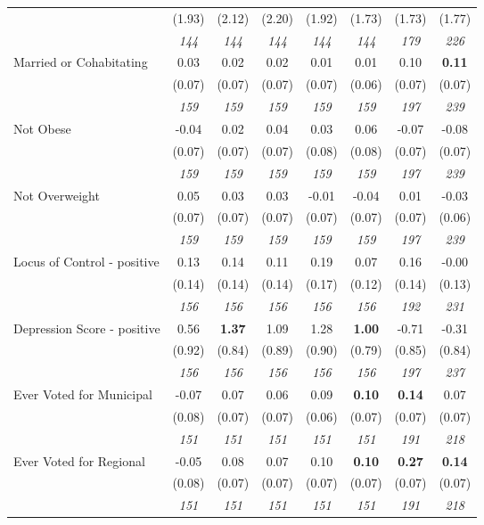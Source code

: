 \begin{tabular}{l c c c c c c c}
& (1.93) & (2.12) & (2.20) & (1.92) & (1.73) & (1.73) & (1.77) \\
& \textit{ 144 } & \textit{ 144 } & \textit{ 144 } & \textit{ 144 } & \textit{ 144 } & \textit{ 179 } & \textit{ 226 } \\
Married or Cohabitating & 0.03 & 0.02 & 0.02 & 0.01 & 0.01 & 0.10 & \textbf{0.11} \\
& (0.07) & (0.07) & (0.07) & (0.07) & (0.06) & (0.07) & (0.07) \\
& \textit{ 159 } & \textit{ 159 } & \textit{ 159 } & \textit{ 159 } & \textit{ 159 } & \textit{ 197 } & \textit{ 239 } \\
Not Obese & -0.04 & 0.02 & 0.04 & 0.03 & 0.06 & -0.07 & -0.08 \\
& (0.07) & (0.07) & (0.07) & (0.08) & (0.08) & (0.07) & (0.07) \\
& \textit{ 159 } & \textit{ 159 } & \textit{ 159 } & \textit{ 159 } & \textit{ 159 } & \textit{ 197 } & \textit{ 239 } \\
Not Overweight & 0.05 & 0.03 & 0.03 & -0.01 & -0.04 & 0.01 & -0.03 \\
& (0.07) & (0.07) & (0.07) & (0.07) & (0.07) & (0.07) & (0.06) \\
& \textit{ 159 } & \textit{ 159 } & \textit{ 159 } & \textit{ 159 } & \textit{ 159 } & \textit{ 197 } & \textit{ 239 } \\
Locus of Control - positive & 0.13 & 0.14 & 0.11 & 0.19 & 0.07 & 0.16 & -0.00 \\
& (0.14) & (0.14) & (0.14) & (0.17) & (0.12) & (0.14) & (0.13) \\
& \textit{ 156 } & \textit{ 156 } & \textit{ 156 } & \textit{ 156 } & \textit{ 156 } & \textit{ 192 } & \textit{ 231 } \\
Depression Score - positive & 0.56 & \textbf{ 1.37 } & 1.09 & 1.28 & \textbf{1.00} & -0.71 & -0.31 \\
& (0.92) & (0.84) & (0.89) & (0.90) & (0.79) & (0.85) & (0.84) \\
& \textit{ 156 } & \textit{ 156 } & \textit{ 156 } & \textit{ 156 } & \textit{ 156 } & \textit{ 197 } & \textit{ 237 } \\
Ever Voted for Municipal & -0.07 & 0.07 & 0.06 & 0.09 & \textbf{0.10} & \textbf{0.14} & 0.07 \\
& (0.08) & (0.07) & (0.07) & (0.06) & (0.07) & (0.07) & (0.07) \\
& \textit{ 151 } & \textit{ 151 } & \textit{ 151 } & \textit{ 151 } & \textit{ 151 } & \textit{ 191 } & \textit{ 218 } \\
Ever Voted for Regional & -0.05 & 0.08 & 0.07 & 0.10 & \textbf{0.10} & \textbf{0.27} & \textbf{0.14} \\
& (0.08) & (0.07) & (0.07) & (0.07) & (0.07) & (0.07) & (0.07) \\
& \textit{ 151 } & \textit{ 151 } & \textit{ 151 } & \textit{ 151 } & \textit{ 151 } & \textit{ 191 } & \textit{ 218 } \\
\bottomrule
\end{tabular}
